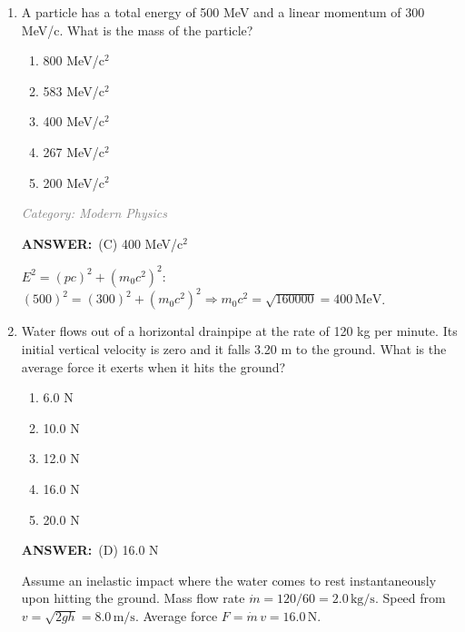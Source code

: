 \documentclass[12pt, a4paper]{article}
\makeatletter
\newcommand{\finalanswer}[1]{\textbf{ANSWER:}~#1}
\newif\if@categoryprinted
\newcommand{\category}[1]{\if@categoryprinted\relax\else\textit{\textcolor{gray}{Category: #1}}\global\@categoryprintedtrue\fi}
\makeatother
\begin{document}
\begin{CJK*}{UTF8}{gbsn}
\begin{enumerate}[itemsep=1.0em, topsep=0.6em]
\item \label{prob:32}
A particle has a total energy of 500 MeV and a linear momentum of 300 MeV/c. What is the mass of the particle?
\begin{enumerate}[label=(\Alph*)]
    \item 800 MeV/c$^2$
    \item 583 MeV/c$^2$
    \item 400 MeV/c$^2$
    \item 267 MeV/c$^2$
    \item 200 MeV/c$^2$
\end{enumerate}

\category{Modern Physics}
\begin{answerbox}
\finalanswer{(C) 400 MeV/c$^2$}
\end{answerbox}
\begin{solutionbox}

$E^2=(pc)^2+(m_0c^2)^2$: $(500)^2=(300)^2+(m_0c^2)^2 \Rightarrow m_0c^2=\sqrt{160000}=400\,\text{MeV}$.
\end{solutionbox}

\newpage

\item \label{prob:33}
Water flows out of a horizontal drainpipe at the rate of 120 kg per minute. Its initial vertical velocity is zero and it falls 3.20 m to the ground. What is the average force it exerts when it hits the ground?
\begin{enumerate}[label=(\Alph*)]
    \item 6.0 N
    \item 10.0 N
    \item 12.0 N
    \item 16.0 N
    \item 20.0 N
\end{enumerate}

\category{Momentum \& Impulse}
\begin{answerbox}
\finalanswer{(D) 16.0 N}
\end{answerbox}
\begin{solutionbox}

Assume an inelastic impact where the water comes to rest instantaneously upon hitting the ground. Mass flow rate $\dot m=120/60=2.0\,\text{kg/s}$. Speed from $v=\sqrt{2gh}=8.0\,\text{m/s}$. Average force $F=\dot m\,v=16.0\,\text{N}$.
\end{solutionbox}


\end{enumerate}
\end{CJK*}
\end{document}
